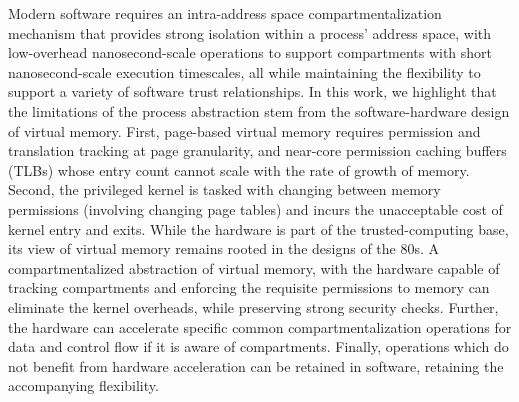 Modern software requires an intra-address space compartmentalization mechanism
that provides strong isolation within a process' address space, with
low-overhead nanosecond-scale operations to support compartments with short
nanosecond-scale execution timescales, all while maintaining the flexibility
to support a variety of software trust relationships.
In this work, we highlight that the limitations of the process abstraction
stem from the software-hardware design of virtual memory.
First, page-based virtual memory requires permission and translation tracking
at page granularity, and near-core permission caching buffers (TLBs) whose
entry count cannot scale with the rate of growth of memory.
Second, the privileged kernel is tasked with changing between memory 
permissions (involving changing page tables) and incurs the unacceptable
cost of kernel entry and exits.
While the hardware is part of the trusted-computing base, its view of virtual
memory remains rooted in the designs of the 80s.
A compartmentalized abstraction of virtual memory, with the hardware capable
of tracking compartments and enforcing the requisite permissions to memory
can eliminate the kernel overheads, while preserving strong security checks.
Further, the hardware can accelerate specific common compartmentalization
operations for data and control flow if it is aware of compartments.
Finally, operations which do not benefit from hardware acceleration can
be retained in software, retaining the accompanying flexibility.

